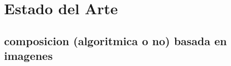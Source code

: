 \section{Estado del Arte}
\label{sec:estadodelarte}



\subsection{composicion (algoritmica o no) basada en imagenes}
